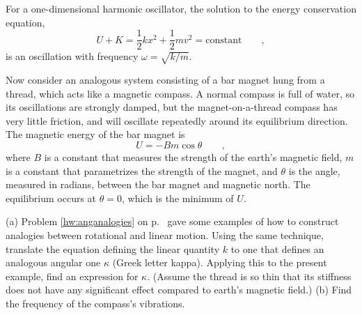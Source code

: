 For a one-dimensional harmonic oscillator, the solution to the
energy conservation equation,
\begin{equation*}
        U+K = \frac{1}{2}kx^2+\frac{1}{2}mv^2 = \text{constant} \qquad ,
\end{equation*}
is an oscillation with frequency $\omega=\sqrt{k/m}$.  

\noindent Now consider an analogous system consisting of a bar magnet hung from a thread,
which acts like a magnetic compass. A normal
compass is full of water, so its oscillations are strongly damped, but the
magnet-on-a-thread compass has very little friction, and will oscillate repeatedly
around its equilibrium direction. The magnetic energy of the bar magnet
is
\begin{equation*}
        U = -Bm\cos\theta \qquad ,
\end{equation*}
where $B$ is a constant that measures the strength of the earth's magnetic field,
$m$ is a constant that parametrizes the strength of the magnet, and
$\theta$ is the angle, measured in radians, 
between the bar magnet and magnetic north. The equilibrium
occurs at $\theta=0$, which is the minimum of $U$.

\noindent (a) Problem \ref{hw:anganalogies} on p.~\pageref{hw:anganalogies} gave some examples of how to construct
analogies between rotational and linear motion. 
Using the same technique, translate the
equation defining the linear quantity $k$ to one that defines an analogous angular
one $\kappa$ (Greek letter kappa). Applying this to the present example, find an
expression for $\kappa$.
(Assume the thread is so thin that its stiffness does not have any significant
effect compared to earth's magnetic field.)\hwendpart
(b) Find the frequency of the compass's vibrations.
